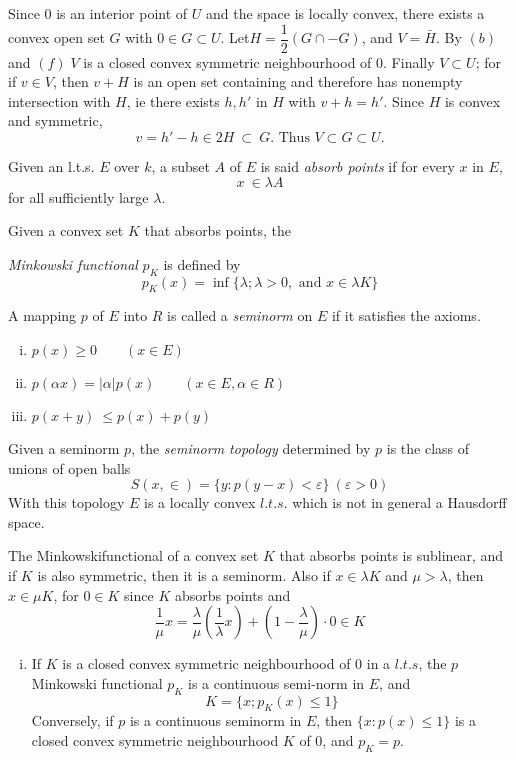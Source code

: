 \begin{enumerate}[a)]
  Since 0 is an interior point of $U$ and the space is locally convex,
  there exists a convex open set $G$ with $0 \in G \subset
  U$. Let\pageoriginale $H 
  = \dfrac{1}{2} (G \cap - G)$, and $V = \bar{H}$. By $(b)$ and $(f)
  \; V  $ is a closed convex symmetric neighbourhood of 0. Finally $V
  \subset U$; for if $v \in V$, then $v +H$ is an open set containing
  and therefore has nonempty intersection with $H$, ie there exists
  $h, h'$ in $H$ with $v+h =h'$. Since $H$ is convex and symmetric, 
  $$
  v=h'-h \in 2H ~ \subset ~G. \text{ Thus } V \subset G \subset U.
  $$
\end{enumerate}

\begin{defi*}
  Given an l.t.s. $E$ over $k$, a subset $A$ of $E$ is said
  \textit{ absorb points } if for every $x$ in $E$, 
  $$
  x ~ \in \lambda A
  $$
  for all sufficiently large $\lambda$.
\end{defi*}

\begin{defi*}
  Given a convex set $K$ that absorbs points, the 
  
  \noindent
  \textit{Minkowski functional } $p_K$ is defined by 
  $$
  p_K(x) = \inf \{\lambda ; \lambda > 0, \text{ and } x \in \lambda K\}
  $$
\end{defi*}

\begin{defi*}
  A mapping $p$ of $E$ into $R$ is called a \textit{seminorm} on $E$
  if it satisfies the axioms. 
\begin{enumerate}[i)]
\item $p(x) \geq 0 \qquad (x \in E)$
\item $p (\alpha x) = | \alpha | p(x) \qquad (x \in E, \alpha \in R)$
\item $p(x+y) ~\leq p(x)+ p(y)$
\end{enumerate}
\end{defi*}

Given a seminorm $p$, the \textit{seminorm topology} determined by
$p$ is the class of unions of open balls  
$$
S(x, \in) = \{y : p(y-x) < \varepsilon\} ~ (\varepsilon >0)
$$
With this topology $E$ is a locally convex $l.t.s$. which is not in
general a Hausdorff space. 

The Minkowski\pageoriginale functional of a convex set $K$ that
absorbs points is 
sublinear, and if $K$ is also symmetric, then it is a seminorm. Also
if $x \in \lambda K$ and $\mu > \lambda$, then $x \in \mu K$, for $0
\in K$ since $K$ absorbs points and  
$$
\frac{1}{\mu} x = \frac{\lambda}{\mu} \left(\frac{1}{\lambda}x\right)
+ \left(1-\frac{\lambda}{\mu}\right) \cdot 0 \in K 
$$
\begin{enumerate}[i)]
\item If $K$ is a closed convex symmetric neighbourhood of $0$ in a
  $l.t.s$, the $p$ Minkowski functional $p_K$ is a continuous
  semi-norm in $E$, and  
  $$
  K= \{x; p_K (x) \leq 1\}
  $$
  Conversely, if $p$ is a continuous seminorm in $E$, then $\{x : p(x)
  \leq 1\}$ is a closed convex symmetric neighbourhood $K$ of $0$, and
  $p_K = p$. 
\end{enumerate}

